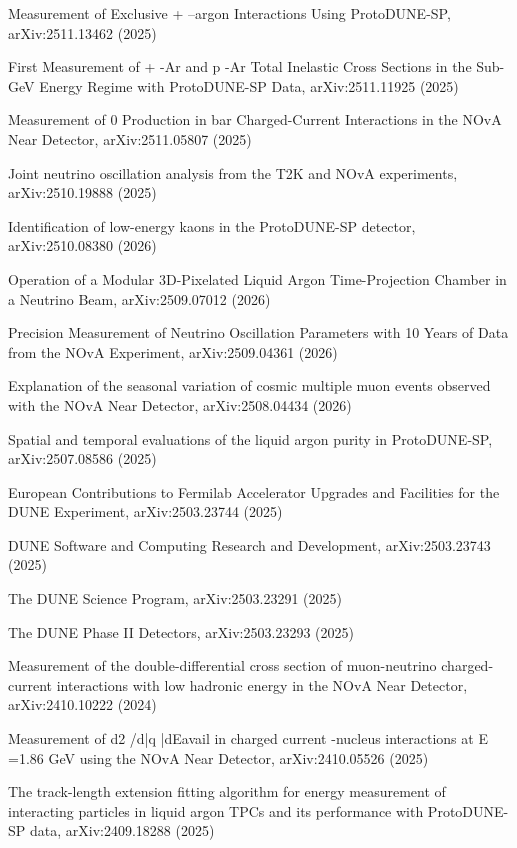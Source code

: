 \begin{list2}
\item Measurement of Exclusive + --argon Interactions Using ProtoDUNE-SP, arXiv:2511.13462 (2025) %
\item First Measurement of + -Ar and p -Ar Total Inelastic Cross Sections in the Sub-GeV Energy Regime with ProtoDUNE-SP Data, arXiv:2511.11925 (2025) %
\item Measurement of 0 Production in bar Charged-Current Interactions in the NOvA Near Detector, arXiv:2511.05807 (2025) %
\item Joint neutrino oscillation analysis from the T2K and NOvA experiments, arXiv:2510.19888 (2025) %
\item Identification of low-energy kaons in the ProtoDUNE-SP detector, arXiv:2510.08380 (2026) %
\item Operation of a Modular 3D-Pixelated Liquid Argon Time-Projection Chamber in a Neutrino Beam, arXiv:2509.07012 (2026) %
\item Precision Measurement of Neutrino Oscillation Parameters with 10 Years of Data from the NOvA Experiment, arXiv:2509.04361 (2026) %
\item Explanation of the seasonal variation of cosmic multiple muon events observed with the NOvA Near Detector, arXiv:2508.04434 (2026) %
\item Spatial and temporal evaluations of the liquid argon purity in ProtoDUNE-SP, arXiv:2507.08586 (2025) %
\item European Contributions to Fermilab Accelerator Upgrades and Facilities for the DUNE Experiment, arXiv:2503.23744 (2025) %
\item DUNE Software and Computing Research and Development, arXiv:2503.23743 (2025) %
\item The DUNE Science Program, arXiv:2503.23291 (2025) %
\item The DUNE Phase II Detectors, arXiv:2503.23293 (2025) %
\item Measurement of the double-differential cross section of muon-neutrino charged-current interactions with low hadronic energy in the NOvA Near Detector, arXiv:2410.10222 (2024) %
\item Measurement of d2 /d|q |dEavail in charged current -nucleus interactions at E =1.86 GeV using the NOvA Near Detector, arXiv:2410.05526 (2025) %
\item The track-length extension fitting algorithm for energy measurement of interacting particles in liquid argon TPCs and its performance with ProtoDUNE-SP data, arXiv:2409.18288 (2025) %

\end{list2}
